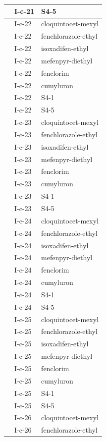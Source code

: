 \documentclass[11pt,a4paper]{article}
\begin{document}
\begin{table}[h]
\begin{tabular}{|l|l|l|}
 & I-c-21 & S4-5 \\ \hline
 & I-c-22 & cloquintocet-mexyl \\ \hline
 & I-c-22 & fenchlorazole-ethyl \\ \hline
 & I-c-22 & isoxadifen-ethyl \\ \hline
 & I-c-22 & mefenpyr-diethyl \\ \hline
 & I-c-22 & fenclorim \\ \hline
 & I-c-22 & cumyluron \\ \hline
 & I-c-22 & S4-1 \\ \hline
 & I-c-22 & S4-5 \\ \hline
 & I-c-23 & cloquintocet-mexyl \\ \hline
 & I-c-23 & fenchlorazole-ethyl \\ \hline
 & I-c-23 & isoxadifen-ethyl \\ \hline
 & I-c-23 & mefenpyr-diethyl \\ \hline
 & I-c-23 & fenclorim \\ \hline
 & I-c-23 & cumyluron \\ \hline
 & I-c-23 & S4-1 \\ \hline
 & I-c-23 & S4-5 \\ \hline
 & I-c-24 & cloquintocet-mexyl \\ \hline
 & I-c-24 & fenchlorazole-ethyl \\ \hline
 & I-c-24 & isoxadifen-ethyl \\ \hline
 & I-c-24 & mefenpyr-diethyl \\ \hline
 & I-c-24 & fenclorim \\ \hline
 & I-c-24 & cumyluron \\ \hline
 & I-c-24 & S4-1 \\ \hline
 & I-c-24 & S4-5 \\ \hline
 & I-c-25 & cloquintocet-mexyl \\ \hline
 & I-c-25 & fenchlorazole-ethyl \\ \hline
 & I-c-25 & isoxadifen-ethyl \\ \hline
 & I-c-25 & mefenpyr-diethyl \\ \hline
 & I-c-25 & fenclorim \\ \hline
 & I-c-25 & cumyluron \\ \hline
 & I-c-25 & S4-1 \\ \hline
 & I-c-25 & S4-5 \\ \hline
 & I-c-26 & cloquintocet-mexyl \\ \hline
 & I-c-26 & fenchlorazole-ethyl \\ \hline

\end{tabular}
\end{table}
\end{document}
